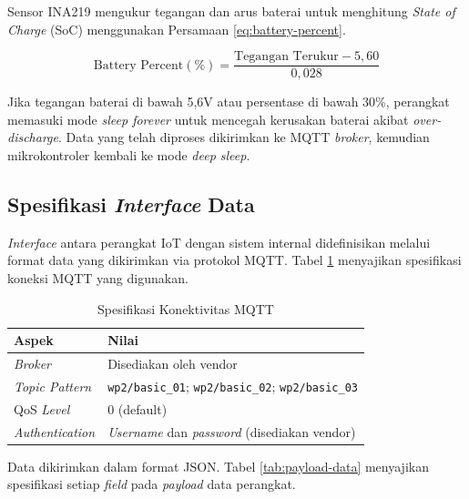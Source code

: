 Sensor INA219 mengukur tegangan dan arus baterai untuk menghitung \textit{State of Charge} (SoC) menggunakan Persamaan \ref{eq:battery-percent}.

\begin{equation}
  \text{Battery Percent} (\%) = \frac{\text{Tegangan Terukur} - 5{,}60}{0{,}028}
  \label{eq:battery-percent}
\end{equation}

Jika tegangan baterai di bawah 5,6V atau persentase di bawah 30\%, perangkat memasuki mode \textit{sleep forever} untuk mencegah kerusakan baterai akibat \textit{over-discharge}. Data yang telah diproses dikirimkan ke MQTT \textit{broker}, kemudian mikrokontroler kembali ke mode \textit{deep sleep}.

\subsection{Spesifikasi \textit{Interface} Data}

\textit{Interface} antara perangkat IoT dengan sistem internal didefinisikan melalui format data yang dikirimkan via protokol MQTT. Tabel \ref{tab:spesifikasi-mqtt} menyajikan spesifikasi koneksi MQTT yang digunakan.

\begin{table}[H]
  \caption{Spesifikasi Konektivitas MQTT}
  \label{tab:spesifikasi-mqtt}
  \begin{tabularx}{\textwidth}{| l | X |}
    \hline
    \textbf{Aspek} & \textbf{Nilai} \\
    \hline
    \textit{Broker} & Disediakan oleh vendor \\
    \hline
    \textit{Topic Pattern} & \texttt{wp2/basic\_01}; \texttt{wp2/basic\_02}; \texttt{wp2/basic\_03} \\
    \hline
    QoS \textit{Level} & 0 (default) \\
    \hline
    \textit{Authentication} & \textit{Username} dan \textit{password} (disediakan vendor) \\
    \hline
  \end{tabularx}
\end{table}

Data dikirimkan dalam format JSON. Tabel \ref{tab:payload-data} menyajikan spesifikasi setiap \textit{field} pada \textit{payload} data perangkat.


